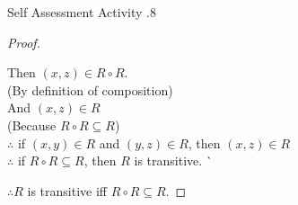 \documentclass[../notes.tex]{subfiles}
\begin{document}
\begin{exercise}{Self Assessment Activity \thechapter.8}
\begin{enumerate}
\begin{proof}
\begin{enumerate}[label=(\roman*)]
\begin{subproof}[Subproof]
\begin{tabbing}
												Then \> $(x, z) \in R \circ R$.\\
												\> (By definition of composition)\\
												And \> $(x, z) \in R$\\
												\> (Because $R \circ R \subseteq R$)\\
												$\therefore$ \> if $(x, y) \in R$ and $(y, z) \in R$, then $(x, z) \in R$\\
												$\therefore$ \> if $R \circ R \subseteq R$, then $R$ is transitive. \` \qedhere
											\end{tabbing}
										\end{subproof}
								\end{enumerate}
								$\therefore R$ is transitive iff $R \circ R \subseteq R$.
							\end{proof}
					\end{enumerate}
				\end{exercise}
\end{document}
